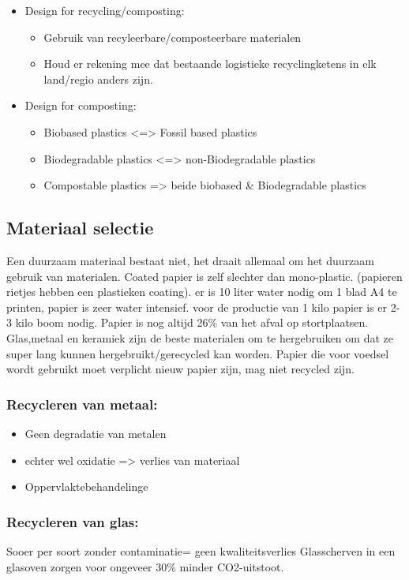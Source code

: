 \documentclass[12pt]{article}
\begin{document}
\begin{itemize}
\begin{itemize}
    \end{itemize}
    \item Design for recycling/composting:\begin{itemize}
        \item Gebruik van recyleerbare/composteerbare materialen 
        \item Houd er rekening mee dat bestaande logistieke recyclingketens in elk land/regio anders zijn.
    \end{itemize}
    \item Design for composting:\begin{itemize}
        \item Biobased plastics <=> Fossil based plastics 
        \item Biodegradable plastics <=> non-Biodegradable plastics 
        \item Compostable plastics => beide biobased \& Biodegradable plastics
    \end{itemize}
\end{itemize}
\subsection{Materiaal selectie}
Een duurzaam materiaal bestaat niet, het draait allemaal om het duurzaam gebruik van materialen. Coated papier is zelf slechter dan mono-plastic. (papieren rietjes hebben een plastieken coating). er is 10 liter water nodig om 1 blad A4 te printen, papier is zeer water intensief. voor de productie van 1 kilo papier is er 2-3 kilo boom nodig. Papier is nog altijd 26\% van het afval op stortplaatsen. Glas,metaal en keramiek zijn de beste materialen om te hergebruiken om dat ze super lang kunnen hergebruikt/gerecycled kan worden. Papier die voor voedsel wordt gebruikt moet verplicht nieuw papier zijn, mag niet recycled zijn.
\subsubsection{Recycleren van metaal:}
\begin{itemize}
    \item Geen degradatie van metalen 
    \item echter wel oxidatie => verlies van materiaal 
    \item Oppervlaktebehandelinge
\end{itemize}
\subsubsection{Recycleren van glas:}
Sooer per soort zonder contaminatie= geen kwaliteitsverlies
Glasscherven in een glasoven zorgen voor ongeveer 30\% minder CO2-uitstoot.
\end{document}
